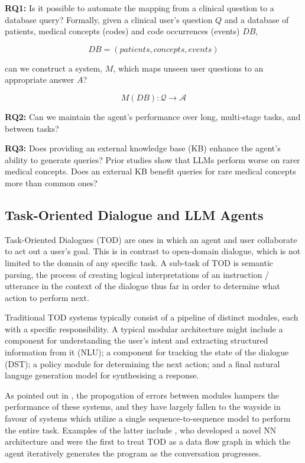 \documentclass[11pt]{article}
\begin{document}
\textbf{RQ1:} Is it possible to automate the mapping from a clinical question to a database query? Formally, given a clinical user's question $Q$ and a database of patients, medical concepts (codes) and code occurrences (events) $DB$,

  $$ DB = (patients, concepts, events) $$

can we construct a system, $M$, which maps unseen user questions to an appropriate answer $A$?

  $$ M(DB): \mathcal{Q} \rightarrow \mathcal{A} $$

\textbf{RQ2:} Can we maintain the agent's performance over long, multi-stage tasks, and between tasks?

\textbf{RQ3:} Does providing an external knowledge base (KB) enhance the agent's ability to generate queries? Prior studies show that LLMs perform worse on rarer medical concepts. Does an external KB benefit queries for rare medical concepts more than common ones?

\subsection{Task-Oriented Dialogue and LLM Agents}
Task-Oriented Dialogues (TOD) are ones in which an agent and user collaborate to act out a user's goal. This is in contrast to open-domain dialogue, which is not limited to the domain of any specific task. A sub-task of TOD is semantic parsing, the process of creating logical interpretations of an instruction / utterance in the context of the dialogue thus far in order to determine what action to perform next.

Traditional TOD systems typically consist of a pipeline of distinct modules, each with a specific responsibility. A typical modular architecture might include a component for understanding the user's intent and extracting structured information from it (NLU); a component for tracking the state of the dialogue (DST); a policy module for determining the next action; and a final natural languge generation model for synthesising a response.  

As pointed out in \citet{yi_survey_2025}, the propogation of errors between modules hampers the performance of these systems, and they have largely fallen to the wayside in favour of systems which utilize a single sequence-to-sequence model to perform the entire task. Examples of the latter include \citet{wen_network-based_2017}, who developed a novel NN architecture and \citet{andreas_task-oriented_2020} were the first to treat TOD as a data flow graph in which the agent iteratively generates the program as the conversation progresses.
\end{document}
